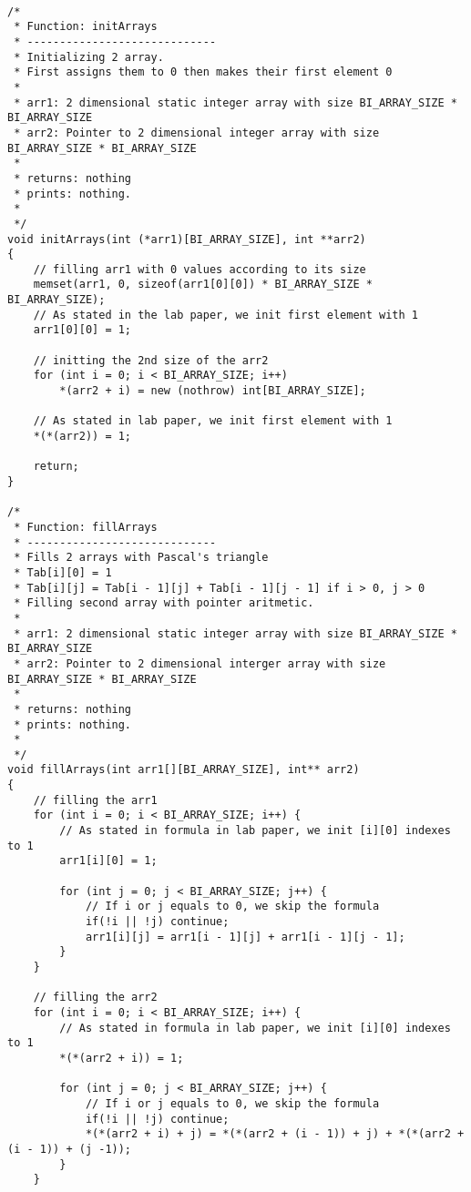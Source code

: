 \documentclass{article}
\begin{document}
		\begin{lstlisting}[label=bidimensional-array,caption=Bidimensional Pascal Array]	

/*
 * Function: initArrays
 * -----------------------------
 * Initializing 2 array.
 * First assigns them to 0 then makes their first element 0
 *
 * arr1: 2 dimensional static integer array with size BI_ARRAY_SIZE * BI_ARRAY_SIZE
 * arr2: Pointer to 2 dimensional integer array with size BI_ARRAY_SIZE * BI_ARRAY_SIZE
 *
 * returns: nothing
 * prints: nothing.
 *
 */
void initArrays(int (*arr1)[BI_ARRAY_SIZE], int **arr2)
{
    // filling arr1 with 0 values according to its size
    memset(arr1, 0, sizeof(arr1[0][0]) * BI_ARRAY_SIZE * BI_ARRAY_SIZE);
    // As stated in the lab paper, we init first element with 1
    arr1[0][0] = 1;
    
    // initting the 2nd size of the arr2
    for (int i = 0; i < BI_ARRAY_SIZE; i++)
        *(arr2 + i) = new (nothrow) int[BI_ARRAY_SIZE];
    
    // As stated in lab paper, we init first element with 1
    *(*(arr2)) = 1;
    
    return;
}

/*
 * Function: fillArrays
 * -----------------------------
 * Fills 2 arrays with Pascal's triangle
 * Tab[i][0] = 1
 * Tab[i][j] = Tab[i - 1][j] + Tab[i - 1][j - 1] if i > 0, j > 0
 * Filling second array with pointer aritmetic.
 *
 * arr1: 2 dimensional static integer array with size BI_ARRAY_SIZE * BI_ARRAY_SIZE
 * arr2: Pointer to 2 dimensional interger array with size BI_ARRAY_SIZE * BI_ARRAY_SIZE
 *
 * returns: nothing
 * prints: nothing.
 *
 */
void fillArrays(int arr1[][BI_ARRAY_SIZE], int** arr2)
{
    // filling the arr1
    for (int i = 0; i < BI_ARRAY_SIZE; i++) {
        // As stated in formula in lab paper, we init [i][0] indexes to 1
        arr1[i][0] = 1;
        
        for (int j = 0; j < BI_ARRAY_SIZE; j++) {
            // If i or j equals to 0, we skip the formula
            if(!i || !j) continue;
            arr1[i][j] = arr1[i - 1][j] + arr1[i - 1][j - 1];
        }
    }
    
    // filling the arr2
    for (int i = 0; i < BI_ARRAY_SIZE; i++) {
        // As stated in formula in lab paper, we init [i][0] indexes to 1
        *(*(arr2 + i)) = 1;
        
        for (int j = 0; j < BI_ARRAY_SIZE; j++) {
            // If i or j equals to 0, we skip the formula
            if(!i || !j) continue;
            *(*(arr2 + i) + j) = *(*(arr2 + (i - 1)) + j) + *(*(arr2 + (i - 1)) + (j -1));
        }
    }
    

\end{lstlisting}
\end{document}
